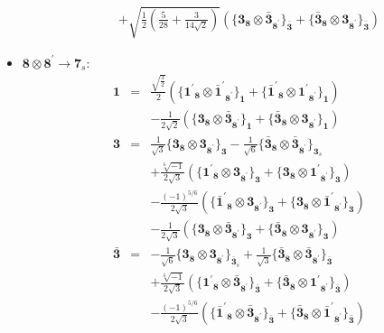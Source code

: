 \documentclass[english]{article}
\newcommand{\subcg}[3]{\big\{ {#1}\otimes{#2}\big\}^{}_{#3}}
\newcommand{\rep}[1]{\mathbf{#1}}
\begin{document}
\begin{itemize}
\begin{eqnarray*}
 & & +\sqrt{\frac{1}{2} \left(\frac{5}{28}+\frac{3}{14 \sqrt{2}}\right)}\left(\subcg{\rep{3}_{\rep{8}}}{\rep{\bar{3}}_{\rep{8^{\prime}}}}{\rep{\bar{3}}}+\subcg{\rep{\bar{3}}_{\rep{8}}}{\rep{3}_{\rep{8^{\prime}}}}{\rep{\bar{3}}}\right)
\end{eqnarray*}
\item $\rep{8}\otimes\rep{8^{\prime}}\to\rep{7}_{s}$:
\begin{eqnarray*}
\rep{1} &=& \frac{\sqrt{\frac{3}{2}}}{2}\left(\subcg{\rep{1^{\prime}}_{\rep{8}}}{\rep{\bar{1}^{\prime}}_{\rep{8^{\prime}}}}{\rep{1}}+\subcg{\rep{\bar{1}^{\prime}}_{\rep{8}}}{\rep{1^{\prime}}_{\rep{8^{\prime}}}}{\rep{1}}\right) \\ 
 & & -\frac{1}{2 \sqrt{2}}\left(\subcg{\rep{3}_{\rep{8}}}{\rep{\bar{3}}_{\rep{8^{\prime}}}}{\rep{1}}+\subcg{\rep{\bar{3}}_{\rep{8}}}{\rep{3}_{\rep{8^{\prime}}}}{\rep{1}}\right)
\\
\rep{3} &=& \frac{1}{\sqrt{3}}\subcg{\rep{3}_{\rep{8}}}{\rep{3}_{\rep{8^{\prime}}}}{\rep{3}}-\frac{1}{\sqrt{6}}\subcg{\rep{\bar{3}}_{\rep{8}}}{\rep{\bar{3}}_{\rep{8^{\prime}}}}{\rep{3}_{s}} \\ 
 & & +\frac{\sqrt[6]{-1}}{2 \sqrt{3}}\left(\subcg{\rep{1^{\prime}}_{\rep{8}}}{\rep{3}_{\rep{8^{\prime}}}}{\rep{3}}+\subcg{\rep{3}_{\rep{8}}}{\rep{1^{\prime}}_{\rep{8^{\prime}}}}{\rep{3}}\right) \\ 
 & & -\frac{(-1)^{5/6}}{2 \sqrt{3}}\left(\subcg{\rep{\bar{1}^{\prime}}_{\rep{8}}}{\rep{3}_{\rep{8^{\prime}}}}{\rep{3}}+\subcg{\rep{3}_{\rep{8}}}{\rep{\bar{1}^{\prime}}_{\rep{8^{\prime}}}}{\rep{3}}\right) \\ 
 & & -\frac{1}{2 \sqrt{3}}\left(\subcg{\rep{3}_{\rep{8}}}{\rep{\bar{3}}_{\rep{8^{\prime}}}}{\rep{3}}+\subcg{\rep{\bar{3}}_{\rep{8}}}{\rep{3}_{\rep{8^{\prime}}}}{\rep{3}}\right)
\\
\rep{\bar{3}} &=& -\frac{1}{\sqrt{6}}\subcg{\rep{3}_{\rep{8}}}{\rep{3}_{\rep{8^{\prime}}}}{\rep{\bar{3}}_{s}}+\frac{1}{\sqrt{3}}\subcg{\rep{\bar{3}}_{\rep{8}}}{\rep{\bar{3}}_{\rep{8^{\prime}}}}{\rep{\bar{3}}} \\ 
 & & +\frac{\sqrt[6]{-1}}{2 \sqrt{3}}\left(\subcg{\rep{1^{\prime}}_{\rep{8}}}{\rep{\bar{3}}_{\rep{8^{\prime}}}}{\rep{\bar{3}}}+\subcg{\rep{\bar{3}}_{\rep{8}}}{\rep{1^{\prime}}_{\rep{8^{\prime}}}}{\rep{\bar{3}}}\right) \\ 
 & & -\frac{(-1)^{5/6}}{2 \sqrt{3}}\left(\subcg{\rep{\bar{1}^{\prime}}_{\rep{8}}}{\rep{\bar{3}}_{\rep{8^{\prime}}}}{\rep{\bar{3}}}+\subcg{\rep{\bar{3}}_{\rep{8}}}{\rep{\bar{1}^{\prime}}_{\rep{8^{\prime}}}}{\rep{\bar{3}}}\right) \\ 

\end{eqnarray*}
\end{itemize}
\end{document}
